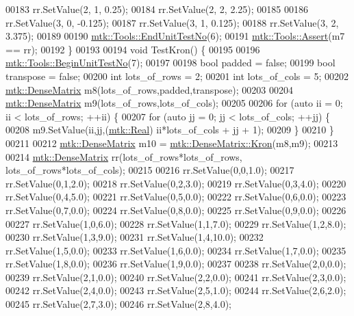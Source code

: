 \begin{DoxyCode}
00183   rr.SetValue(2, 1, 0.25);
00184   rr.SetValue(2, 2, 2.25);
00185 
00186   rr.SetValue(3, 0, -0.125);
00187   rr.SetValue(3, 1, 0.125);
00188   rr.SetValue(3, 2, 3.375);
00189 
00190   \hyperlink{classmtk_1_1Tools_aba67d9dc35c9c1c49430fcc9ea035e03}{mtk::Tools::EndUnitTestNo}(6);
00191   \hyperlink{classmtk_1_1Tools_ac6804df469c94ab6a796fb64f1e44a89}{mtk::Tools::Assert}(m7 == rr);
00192 \}
00193 
00194 \textcolor{keywordtype}{void} TestKron() \{
00195 
00196   \hyperlink{classmtk_1_1Tools_afc29ecaf337a13ed2e817d3890a5a441}{mtk::Tools::BeginUnitTestNo}(7);
00197 
00198   \textcolor{keywordtype}{bool} padded = \textcolor{keyword}{false};
00199   \textcolor{keywordtype}{bool} transpose = \textcolor{keyword}{false};
00200   \textcolor{keywordtype}{int} lots\_of\_rows = 2;
00201   \textcolor{keywordtype}{int} lots\_of\_cols = 5;
00202   \hyperlink{classmtk_1_1DenseMatrix}{mtk::DenseMatrix} m8(lots\_of\_rows,padded,transpose);
00203 
00204   \hyperlink{classmtk_1_1DenseMatrix}{mtk::DenseMatrix} m9(lots\_of\_rows,lots\_of\_cols);
00205 
00206   \textcolor{keywordflow}{for} (\textcolor{keyword}{auto} ii = 0; ii < lots\_of\_rows; ++ii) \{
00207     \textcolor{keywordflow}{for} (\textcolor{keyword}{auto} jj = 0; jj < lots\_of\_cols; ++jj) \{
00208       m9.SetValue(ii,jj,(\hyperlink{group__c01-roots_gac080bbbf5cbb5502c9f00405f894857d}{mtk::Real}) ii*lots\_of\_cols + jj + 1);
00209     \}
00210   \}
00211 
00212   \hyperlink{classmtk_1_1DenseMatrix}{mtk::DenseMatrix} m10 = \hyperlink{classmtk_1_1DenseMatrix_a01d3d8bd502870f93bf3a88a0cc5fb49}{mtk::DenseMatrix::Kron}(m8,m9);
00213 
00214   \hyperlink{classmtk_1_1DenseMatrix}{mtk::DenseMatrix} rr(lots\_of\_rows*lots\_of\_rows, lots\_of\_rows*lots\_of\_cols);
00215 
00216   rr.SetValue(0,0,1.0);
00217   rr.SetValue(0,1,2.0);
00218   rr.SetValue(0,2,3.0);
00219   rr.SetValue(0,3,4.0);
00220   rr.SetValue(0,4,5.0);
00221   rr.SetValue(0,5,0.0);
00222   rr.SetValue(0,6,0.0);
00223   rr.SetValue(0,7,0.0);
00224   rr.SetValue(0,8,0.0);
00225   rr.SetValue(0,9,0.0);
00226 
00227   rr.SetValue(1,0,6.0);
00228   rr.SetValue(1,1,7.0);
00229   rr.SetValue(1,2,8.0);
00230   rr.SetValue(1,3,9.0);
00231   rr.SetValue(1,4,10.0);
00232   rr.SetValue(1,5,0.0);
00233   rr.SetValue(1,6,0.0);
00234   rr.SetValue(1,7,0.0);
00235   rr.SetValue(1,8,0.0);
00236   rr.SetValue(1,9,0.0);
00237 
00238   rr.SetValue(2,0,0.0);
00239   rr.SetValue(2,1,0.0);
00240   rr.SetValue(2,2,0.0);
00241   rr.SetValue(2,3,0.0);
00242   rr.SetValue(2,4,0.0);
00243   rr.SetValue(2,5,1.0);
00244   rr.SetValue(2,6,2.0);
00245   rr.SetValue(2,7,3.0);
00246   rr.SetValue(2,8,4.0);

\end{DoxyCode}
